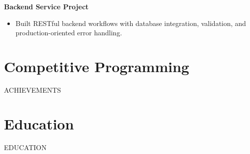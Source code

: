 \documentclass[10pt]{article}
\begin{document}
\textbf{Backend Service Project}\\
\begin{itemize}
\item Built RESTful backend workflows with database integration, validation, and production-oriented error handling.
\end{itemize}

\section*{Competitive Programming}
{{ACHIEVEMENTS}}

\section*{Education}
{{EDUCATION}}
\end{document}
